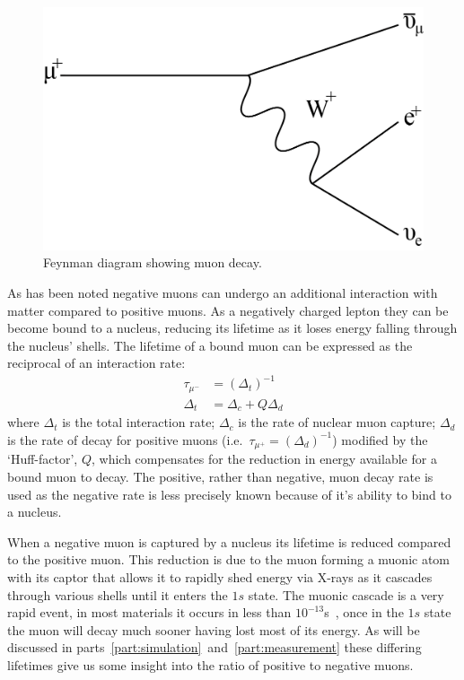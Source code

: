 \begin{figure}[hptb]
  \centering
    \includegraphics[scale=1]{images/muon_decay_feynmann.png}
  \caption{Feynman diagram showing muon decay.}
  \label{fig:muon_decay_feynmann}
\end{figure}

As has been noted negative muons can undergo an additional interaction with matter compared to positive muons. As a negatively charged lepton they can be become bound to a nucleus, reducing its lifetime as it loses energy falling through the nucleus' shells. The lifetime of a bound muon can be expressed as the reciprocal of an interaction rate:
\begin{align}
  \tau_{\mu^-} &= (\Delta_t)^{-1}\\
  \Delta_t &= \Delta_c + Q\Delta_d \label{eq:capture_rate}
\end{align}
where \( \Delta_t \) is the total interaction rate; \( \Delta_c \) is the rate of nuclear muon capture; \( \Delta_d \) is the rate of decay for positive muons (i.e.\ \( \tau_{\mu^+} = (\Delta_d)^{-1}  \)) modified by the `Huff-factor', \( Q \), which compensates for the reduction in energy available for a bound muon to decay. The positive, rather than negative, muon decay rate is used as the negative rate is less precisely known because of it's ability to bind to a nucleus.

When a negative muon is captured by a nucleus its lifetime is reduced compared to the positive muon. This reduction is due to the muon forming a muonic atom with its captor that allows it to rapidly shed energy via X-rays as it cascades through various shells until it enters the \( 1s \) state. The muonic cascade is a very rapid event, in most materials it occurs in less than \( 10^{-13}\)s~\cite{review_nuclear_physics_mu_capture_measday}, once in the \( 1s \) state the muon will decay much sooner having lost most of its energy. As will be discussed in parts~\ref{part:simulation}~and~\ref{part:measurement} these differing lifetimes give us some insight into the ratio of positive to negative muons.

